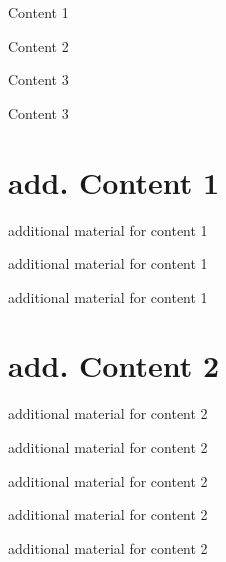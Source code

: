 \documentclass{beamer}
\begin{document}
\begin{frame}
Content 1
\end{frame}
\begin{frame}
Content 2
\end{frame}
\begin{frame}
Content 3
\end{frame}
\begin{frame}
Content 3
\end{frame}
\appendix
\section[]{add. Content 1}
\begin{frame}
additional material for content 1
\end{frame}
\begin{frame}
additional material for content 1
\end{frame}
\begin{frame}
additional material for content 1
\end{frame}
\section[]{add. Content 2}
\begin{frame}
additional material for content 2
\end{frame}
\begin{frame}
additional material for content 2
\end{frame}
\begin{frame}
additional material for content 2
\end{frame}
\begin{frame}
additional material for content 2
\end{frame}
\begin{frame}
additional material for content 2
\end{frame}
\end{document}

